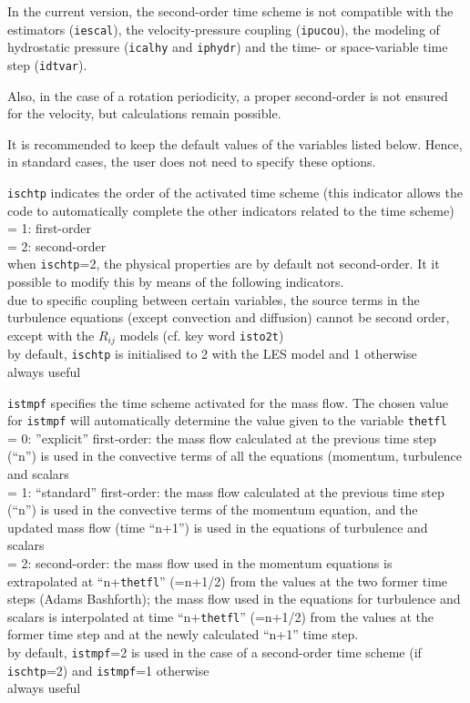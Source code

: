 In the current version, the second-order time scheme is not compatible
with the estimators ({\tt iescal}), the velocity-pressure coupling
({\tt ipucou}), the modeling of hydrostatic pressure ({\tt icalhy} and
{\tt iphydr}) and the time- or space-variable time step ({\tt idtvar}).

Also, in the case of a rotation periodicity, a proper second-order is not
ensured for the velocity, but calculations remain possible.

It is recommended to keep the default values of the variables listed
below. Hence, in standard cases, the user does not need to specify these
options.


{{\tt ischtp} indicates the order of the
activated time scheme (this indicator allows the code to automatically complete
the other indicators related to the time scheme)\\
\hspace*{1.3cm}= 1: first-order \\
\hspace*{1.3cm}= 2: second-order \\
when {\tt ischtp}=2, the physical properties are by default not
second-order. It it possible to modify this by means of the
following indicators.\\
due to specific coupling between certain variables, the source terms in the
turbulence equations (except convection and diffusion) cannot be second order,
except with the $R_{ij}$ models (cf. key word {\tt isto2t})\\
by default, {\tt ischtp} is initialised to 2 with the LES model and 1
otherwise\\
always useful}

{{\tt istmpf} specifies the time scheme activated
for the mass flow. The chosen value for {\tt istmpf} will automatically
determine the value given to the variable {\tt thetfl}\\
\hspace*{1.3cm}= 0: ''explicit'' first-order: the mass flow calculated
at the previous time step (``n'') is used in the convective terms of all
the equations (momentum, turbulence and scalars\\
\hspace*{1.3cm}= 1: ``standard'' first-order: the mass flow calculated
at the previous time step (``n'') is used in the convective terms of the
momentum equation, and the updated mass flow (time ``n+1'') is used in the
equations of turbulence and scalars\\
\hspace*{1.3cm}= 2: second-order: the mass flow used in the momentum equations
is extrapolated at ``n+{\tt thetfl}'' (=n+1/2) from the values at the two former time
steps (Adams Bashforth); the mass flow used in the equations for turbulence and
scalars is interpolated at time ``n+{\tt thetfl}'' (=n+1/2) from the values at the
former time step and at the newly calculated ``n+1'' time step.\\
by default, {\tt istmpf}=2 is used in the case of a second-order time
scheme (if {\tt ischtp}=2) and {\tt istmpf}=1 otherwise\\
always useful}

